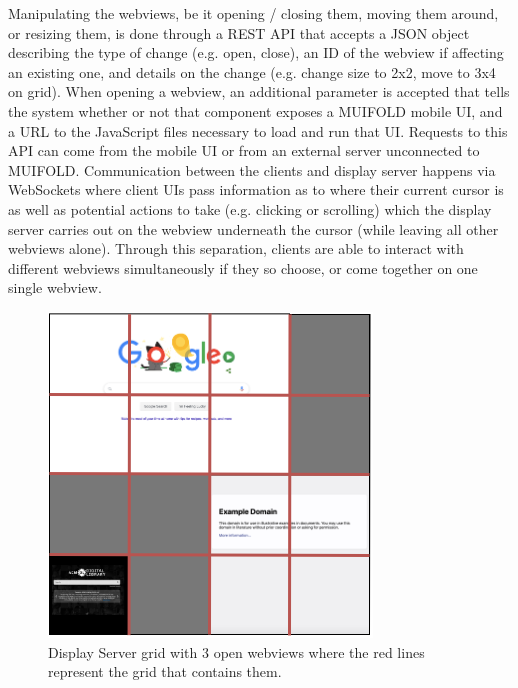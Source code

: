 Manipulating the webviews, be it opening / closing them, moving them
around, or resizing them, is done through a REST API that accepts
a JSON object describing the type of change (e.g. open, close), an
ID of the webview if affecting an existing one, and
details on the change (e.g. change size to 2x2, move to 3x4 on grid).
When opening a webview, an additional parameter is accepted that
tells the system whether or not that component exposes a MUIFOLD
mobile UI, and a URL to the JavaScript files necessary to load and
run that UI. Requests to this API can come from the mobile UI or
from an external server unconnected to MUIFOLD. Communication
between the clients and display server happens via WebSockets where
client UIs pass information as to where their current cursor is
as well as potential actions to take (e.g. clicking or scrolling)
which the display server carries out on the webview underneath
the cursor (while leaving all other webviews alone). Through this
separation, clients are able to interact with different webviews
simultaneously if they so choose, or come together on one single
webview.

\begin{figure}
\centering
  \includegraphics[width=0.65\columnwidth]{figures/display_server}
  \caption{Display Server grid with 3 open webviews where the red lines represent the grid that contains them.}
  \label{fig:display_server_grid}
\end{figure}

